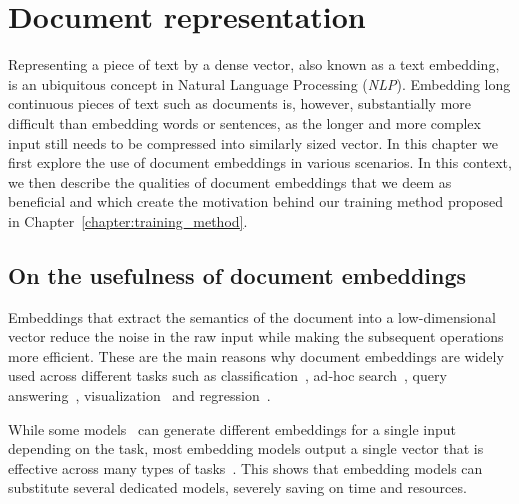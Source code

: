 \chapter{Document representation}\label{chapter:document_representation}

Representing a piece of text by a dense vector, also known as a text embedding,
is an ubiquitous concept in Natural Language Processing (\emph{NLP}). Embedding
long continuous pieces of text such as documents is, however, substantially
more difficult than embedding words or sentences, as the longer and more
complex input still needs to be compressed into similarly sized vector. In this
chapter we first explore the use of document embeddings in various scenarios.
In this context, we then describe the qualities of document embeddings that we
deem as beneficial and which create the motivation behind our training method
proposed in Chapter~\ref{chapter:training_method}.

\section{On the usefulness of document embeddings}



Embeddings that extract the semantics of the document into a low-dimensional
vector reduce the noise in the raw input while making the subsequent operations
more efficient. These are the main reasons why document embeddings are
widely used across different tasks such as
classification~\citep{cohan2020specter, neelakantan2022text,
izacard2021unsupervised, ostendorff2022neighborhood}, ad-hoc
search~\citep{singh2022scirepeval, zamani2018neural}, query
answering~\citep{neelakantan2022text}, visualization~\citep{cohan2020specter,
dai2015document} and regression~\citep{singh2022scirepeval}.

While some models~\citep{singh2022scirepeval} can generate different embeddings
for a single input depending on the task, most embedding models output a single
vector that is effective across many types of tasks~\citep{neelakantan2022text,
cohan2020specter, ostendorff2022neighborhood}. This shows that embedding models
can substitute several dedicated models, severely saving on time and resources.


